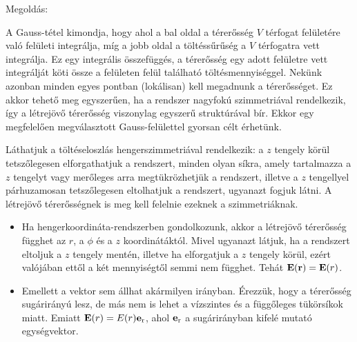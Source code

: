 
\ifdefined\megoldas
  
 
 Megoldás: 


 A Gauss-tétel kimondja, hogy 
 ahol a bal oldal a térerősség $V$ térfogat felületére való felületi integrálja, míg a jobb oldal a töltéssűrűség a $V$ térfogatra vett integrálja. Ez egy integrális összefüggés, a térerősség egy adott felületre vett integrálját köti össze a felületen felül található töltésmennyiséggel. Nekünk azonban minden egyes pontban (lokálisan) kell megadnunk a térerősséget. Ez akkor tehető meg egyszerűen, ha a rendszer nagyfokú szimmetriával rendelkezik, így a létrejövő térerősség viszonylag egyszerű struktúrával bír. Ekkor egy megfelelően megválasztott Gauss-felülettel gyorsan célt érhetünk.

 Láthatjuk a töltéseloszlás hengerszimmetriával rendelkezik: a $z$ tengely körül tetszőlegesen elforgathatjuk a rendszert, minden olyan síkra, amely tartalmazza a $z$ tengelyt vagy merőleges arra megtükrözhetjük a rendszert, illetve a $z$ tengellyel párhuzamosan tetszőlegesen eltolhatjuk a rendszert, ugyanazt fogjuk látni. A létrejövő térerősségnek is meg kell felelnie ezeknek a szimmetriáknak. 
 \begin{itemize}
  \item 
   Ha hengerkoordináta-rendszerben gondolkozunk, akkor a létrejövő térerősség függhet az $r$, a $\phi$ és a $z$ koordinátáktól. Mivel ugyanazt látjuk, ha a rendszert eltoljuk a $z$ tengely mentén, illetve ha elforgatjuk a $z$ tengely körül, ezért valójában ettől a két mennyiségtől semmi nem függhet. Tehát $\mathbf{E}(\mathbf{r})=\mathbf{E}(r)$.
  \item
   Emellett a vektor sem állhat akármilyen irányban. Érezzük, hogy a térerősség sugárirányú lesz, de más nem is lehet a vízszintes és a függőleges tükörsíkok miatt. Emiatt $\mathbf{E}(r)=E(r)\mathbf{e}_\text{r}$, ahol $\mathbf{e}_\text{r}$ a sugárirányban kifelé mutató egységvektor.
 \end{itemize}

